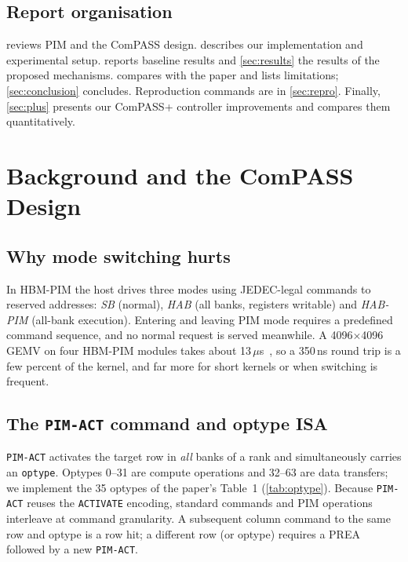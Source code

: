\documentclass[conference]{IEEEtran}
\newcommand{\cmd}[1]{\texttt{\footnotesize #1}}
\newcommand{\pimact}{\cmd{PIM-ACT}\xspace}
\begin{document}
\subsection{Report organisation}
 reviews PIM and the ComPASS design.  describes our implementation and experimental setup.  reports baseline results and \cref{sec:results} the results of the proposed mechanisms.  compares with the paper and lists limitations; \cref{sec:conclusion} concludes. Reproduction commands are in \cref{sec:repro}. Finally, \cref{sec:plus} presents our ComPASS+ controller improvements and compares them quantitatively.

\section{Background and the ComPASS Design}\label{sec:background}

\subsection{Why mode switching hurts}
In HBM-PIM the host drives three modes using JEDEC-legal commands to reserved addresses: \emph{SB} (normal), \emph{HAB} (all banks, registers writable) and \emph{HAB-PIM} (all-bank execution). Entering and leaving PIM mode requires a predefined command sequence, and no normal request is served meanwhile. A 4096$\times$4096 GEMV on four HBM-PIM modules takes about 13\,$\mu$s~\cite{compass}, so a 350\,ns round trip is a few percent of the kernel, and far more for short kernels or when switching is frequent.

\subsection{The \pimact command and optype ISA}
\pimact activates the target row in \emph{all} banks of a rank and simultaneously carries an \cmd{optype}. Optypes 0--31 are compute operations and 32--63 are data transfers; we implement the 35 optypes of the paper's Table~1 (\cref{tab:optype}). Because \pimact reuses the \cmd{ACTIVATE} encoding, standard commands and PIM operations interleave at command granularity. A subsequent column command to the same row and optype is a row hit; a different row (or optype) requires a PREA followed by a new \pimact.
\end{document}
